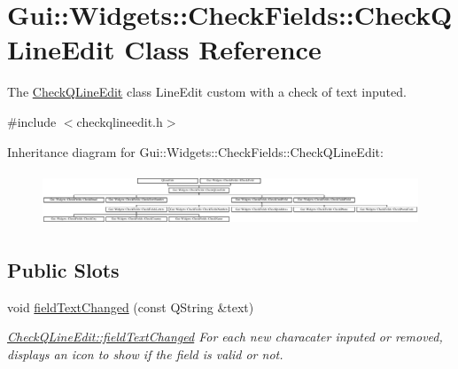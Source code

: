\hypertarget{classGui_1_1Widgets_1_1CheckFields_1_1CheckQLineEdit}{\section{Gui\-:\-:Widgets\-:\-:Check\-Fields\-:\-:Check\-Q\-Line\-Edit Class Reference}
\label{classGui_1_1Widgets_1_1CheckFields_1_1CheckQLineEdit}
}


The \hyperlink{classGui_1_1Widgets_1_1CheckFields_1_1CheckQLineEdit}{Check\-Q\-Line\-Edit} class Line\-Edit custom with a check of text inputed.  




{\ttfamily \#include $<$checkqlineedit.\-h$>$}

Inheritance diagram for Gui\-:\-:Widgets\-:\-:Check\-Fields\-:\-:Check\-Q\-Line\-Edit\-:\begin{figure}[H]
\begin{center}
\leavevmode
\includegraphics[height=1.603665cm]{d0/d68/classGui_1_1Widgets_1_1CheckFields_1_1CheckQLineEdit}
\end{center}
\end{figure}
\subsection*{Public Slots}
\begin{DoxyCompactItemize}
\item 
\hypertarget{classGui_1_1Widgets_1_1CheckFields_1_1CheckQLineEdit_ad297d518964bd170e8cc7533795ff99e}{void \hyperlink{classGui_1_1Widgets_1_1CheckFields_1_1CheckQLineEdit_ad297d518964bd170e8cc7533795ff99e}{field\-Text\-Changed} (const Q\-String \&text)}\label{classGui_1_1Widgets_1_1CheckFields_1_1CheckQLineEdit_ad297d518964bd170e8cc7533795ff99e}

\begin{DoxyCompactList}\small\item\em \hyperlink{classGui_1_1Widgets_1_1CheckFields_1_1CheckQLineEdit_ad297d518964bd170e8cc7533795ff99e}{Check\-Q\-Line\-Edit\-::field\-Text\-Changed} For each new characater inputed or removed, displays an icon to show if the field is valid or not. \end{DoxyCompactList}\end{DoxyCompactItemize}
